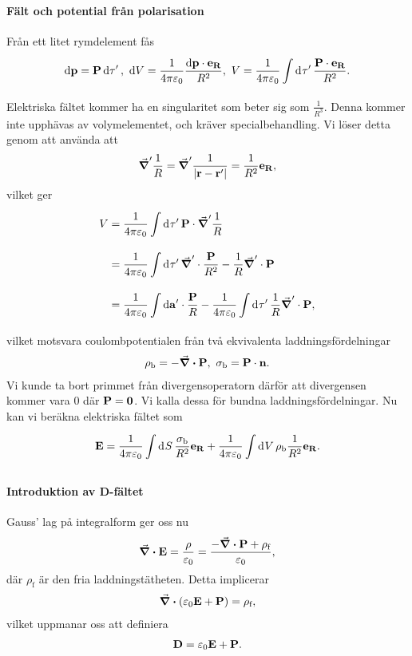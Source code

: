 \paragraph{Fält och potential från polarisation}
Från ett litet rymdelement fås
\begin{align*}
	\dd{\vb{p}} = \vb{P}\dd{\tau'},\ \dd{V} = \frac{1}{4\pi\varepsilon_{0}}\frac{\dd{\vb{p}}\cdot\vb{e}_{\vb{R}}}{R^{2}},\ V = \frac{1}{4\pi\varepsilon_{0}}\int\limits_{}^{}\dd[]{\tau'}\frac{\vb{P}\cdot\vb{e}_{\vb{R}}}{R^{2}}.
\end{align*}
Elektriska fältet kommer ha en singularitet som beter sig som $\frac{1}{R^{3}}$. Denna kommer inte upphävas av volymelementet, och kräver specialbehandling. Vi löser detta genom att använda att
\begin{align*}
	\grad'{\frac{1}{R}} = \grad'{\frac{1}{\abs{\vb{r} - \vb{r}'}}} = \frac{1}{R^{2}}\vb{e}_{\vb{R}},
\end{align*}
vilket ger
\begin{align*}
	V &= \frac{1}{4\pi\varepsilon_{0}}\int\limits_{}^{}\dd[]{\tau'}\vb{P}\cdot\grad^{\prime}{\frac{1}{R}} \\
	  &= \frac{1}{4\pi\varepsilon_{0}}\int\limits_{}^{}\dd[]{\tau'}\grad^{\prime}\cdot{\frac{\vb{P}}{R^{2}}} - \frac{1}{R}\grad^{\prime}\cdot{\vb{P}} \\
	  &= \frac{1}{4\pi\varepsilon_{0}}\int\limits_{}^{}\dd{\vb{a'}}\cdot \frac{\vb{P}}{R} - \frac{1}{4\pi\varepsilon_{0}}\int\limits_{}^{}\dd[]{\tau'}\frac{1}{R}\grad^{\prime}\cdot{\vb{P}},
\end{align*}
vilket motsvara coulombpotentialen från två ekvivalenta laddningsfördelningar
\begin{align*}
	\rho_{\text{b}} = -\div{\vb{P}},\ \sigma_{\text{b}} = \vb{P}\cdot\vb{n}.
\end{align*}
Vi kunde ta bort primmet från divergensoperatorn därför att divergensen kommer vara $0$ där $\vb{P} = \vb{0}$. Vi kalla dessa för bundna laddningsfördelningar. Nu kan vi beräkna elektriska fältet som
\begin{align*}
	\vb{E} = \frac{1}{4\pi\varepsilon_{0}}\int\limits_{}^{}\dd[]{S}\frac{\sigma_{\text{b}}}{R^{2}}\vb{e}_{\vb{R}} + \frac{1}{4\pi\varepsilon_{0}}\int\limits_{}^{}\dd[]{V}\rho_{\text{b}}\frac{1}{R^{2}}\vb{e}_{\vb{R}}.
\end{align*}

\paragraph{Introduktion av D-fältet}
Gauss' lag på integralform ger oss nu
\begin{align*}
	\div{\vb{E}} = \frac{\rho}{\varepsilon_{0}} = \frac{-\div{\vb{P}} + \rho_{\text{f}}}{\varepsilon_{0}},
\end{align*}
där $\rho_{\text{f}}$ är den fria laddningstätheten. Detta implicerar
\begin{align*}
	\div(\varepsilon_{0}\vb{E} + \vb{P}) = \rho_{\text{f}},
\end{align*}
vilket uppmanar oss att definiera
\begin{align*}
	\vb{D} = \varepsilon_{0}\vb{E} + \vb{P}.
\end{align*}

